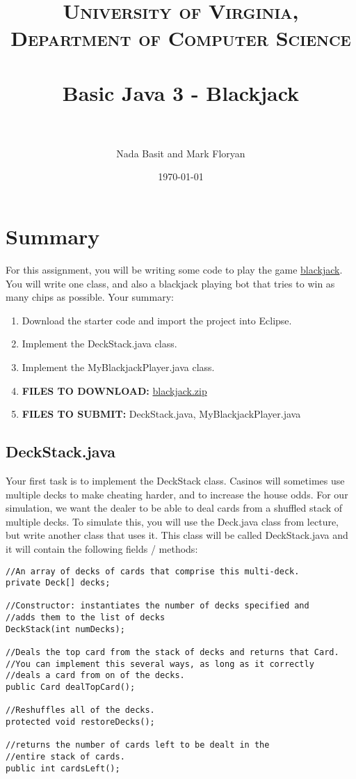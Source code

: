\documentclass[paper=a4, fontsize=11pt, parskip=full]{scrartcl} %
\title{
\normalfont \normalsize
\textsc{University of Virginia, Department of Computer Science} \\ [25pt] %
\horrule{0.5pt} \\[0.4cm] %
\huge Basic Java 3 - Blackjack \\ %
\horrule{2pt} \\[0.5cm] %
}
\author{Nada Basit and Mark Floryan}
\date{\normalsize\today} %
\numberwithin{equation}{section} %
\numberwithin{figure}{section} %
\numberwithin{table}{section} %
\begin{document}
\maketitle %


\section{Summary}

For this assignment, you will be writing some code to play the game \href{https://en.wikipedia.org/wiki/Blackjack}{blackjack}. You will write one class, and also a blackjack playing bot that tries to win as many chips as possible. Your summary:

\begin{enumerate}
	\item Download the starter code and import the project into Eclipse.
	\item Implement the DeckStack.java class.
	\item Implement the MyBlackjackPlayer.java class.
	\item \textbf{FILES TO DOWNLOAD:} \href{https://uva-cs.github.io/dsa1/homeworks/BasicJava3/code/blackjack.zip}{blackjack.zip}
	\item \textbf{FILES TO SUBMIT:} DeckStack.java, MyBlackjackPlayer.java
\end{enumerate}


\subsection{DeckStack.java}

Your first task is to implement the DeckStack class. Casinos will sometimes use multiple decks to make cheating harder, and to increase the house odds. For our simulation, we want the dealer to be able to deal cards from a shuffled stack of multiple decks. To simulate this, you will use the Deck.java class from lecture, but write another class that uses it. This class will be called DeckStack.java and it will contain the following fields / methods:

\begin{lstlisting}
//An array of decks of cards that comprise this multi-deck.
private Deck[] decks;

//Constructor: instantiates the number of decks specified and
//adds them to the list of decks
DeckStack(int numDecks);

//Deals the top card from the stack of decks and returns that Card.
//You can implement this several ways, as long as it correctly
//deals a card from on of the decks.
public Card dealTopCard();

//Reshuffles all of the decks.
protected void restoreDecks();

//returns the number of cards left to be dealt in the
//entire stack of cards.
public int cardsLeft();
\end{lstlisting}
\end{document}
